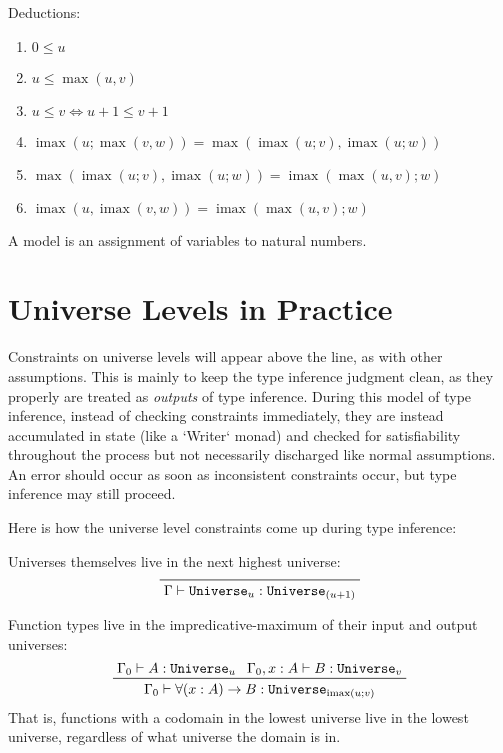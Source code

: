 \documentclass[11pt, twoside, reqno]{book}
\DeclareMathOperator{\imax}{imax}
\begin{document}
Deductions:
\label{alg-uni-laws-more}
\begin{enumerate}
\item \(0 \le u\)
\item \(u \le \max(u, v)\)
\item \(u \le v \iff u+1 \le v+1\)
\item \(\imax(u; \max(v, w)) = \max(\imax(u; v), \imax(u; w))\)
\item \(\max(\imax(u; v), \imax(u; w)) = \imax(\max(u, v); w)\)
\item \(\imax(u, \imax(v, w)) = \imax(\max(u, v); w)\)
\end{enumerate}

A model is an assignment of variables to natural numbers.

\section{Universe Levels in Practice}
\label{uni-lvl-prac}

Constraints on universe levels will appear above the line, as with other assumptions.
This is mainly to keep the type inference judgment clean, as they properly are treated as \emph{outputs} of type inference.
During this model of type inference, instead of checking constraints immediately, they are instead accumulated in state (like a \inHS`Writer` monad) and checked for satisfiability throughout the process but not necessarily discharged like normal assumptions.
An error should occur as soon as inconsistent constraints occur, but type inference may still proceed.

Here is how the universe level constraints come up during type inference:

Universes themselves live in the next highest universe:
\begin{displaymath}
\prftree{\Gamma \vdash \texttt{Universe}_u : \texttt{Universe}_{(u+1)}}
\end{displaymath}

Function types live in the impredicative-maximum of their input and output universes:
\begin{displaymath}
\prftree
  {\Gamma_0 \vdash A : \texttt{Universe}_u}
  {\Gamma_0, x : A \vdash B : \texttt{Universe}_v}
  {\Gamma_0 \vdash \forall (x : A) \to B : \texttt{Universe}_{\imax(u; v)}}
\end{displaymath}
That is, functions with a codomain in the lowest universe live in the lowest universe, regardless of what universe the domain is in.
\end{document}
